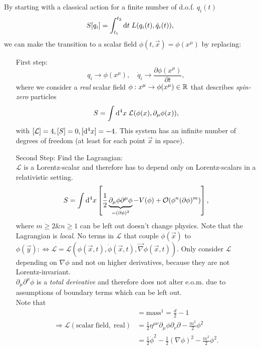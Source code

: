 By starting with a classical action for a finite number of d.o.f. $q_i(t)$ 
\begin{equation}
	S[q_i] = \int_{t_1}^{t_2} \mathrm{d} t \; L(q_i(t),\dot{q}_i(t)),
\end{equation}
we can make the transition to a scalar field $\phi(t,\vec{x})=\phi(x^{\mu})$ by replacing:
\begin{enumerate}
	\item[First step:] 
	\begin{equation}
		q_i \rightarrow \phi(x^{\mu}),\quad \dot{q}_i \rightarrow \frac{\partial \phi(x^{\mu})}{\partial t},
	\end{equation}
	where we consider a \emph{real} scalar field $\phi:x^{\mu} \rightarrow \phi(x^{\mu}) \in \mathbb{R}$ that describes \emph{spin-zero} particles 
	\begin{equation}
		S = \int \mathrm{d}^4 x \; \mathcal{L}(\phi(x),\partial_{\mu} \phi(x)),
	\end{equation}
	with $[\mathcal{L}]=4,[S]=0, [\mathrm{d}^4 x]=-4$. This system has an infinite number of degrees of freedom (at least for each point $\vec{x}$ in space).
	\item[Second Step:] Find the Lagrangian:\\
	$\mathcal{L}$ is a Lorentz-scalar and therefore has to depend only on Lorentz-scalars in a relativistic setting.
	\begin{equation}
		S = \int \mathrm{d}^4 x \left[\frac{1}{2} \underbrace{\partial_{\mu}\phi \partial^{\mu} \phi}_{=(\partial \phi)^2} -V(\phi) + \mathcal{O}(\phi^n (\partial \phi)^m)\right],
	\end{equation}
	where $m\geq2 \& n\geq1$ can be left out doesn't change physics.
	Note that the Lagrangian is \emph{local}. No terms in $\mathcal{L}$ that couple $\phi(\vec{x})$ to $\phi(\vec{y}): \Leftrightarrow \mathcal{L}=\mathcal{L}\left(\phi(\vec{x},t),\dot{\phi}(\vec{x},t), \vec{\nabla} \phi(\vec{x},t)\right)$. Only consider $\mathcal{L}$ depending on $\nabla\phi$ and not on higher derivatives, because they are not Lorentz-invariant.\\
	$\partial_{\mu}\partial^{\mu}\phi$ is a \emph{total derivative} and therefore does not alter e.o.m. due to assumptions of boundary terms which can be left out.\\
	Note that
	\begin{align}
		[\phi] &= \mathrm{mass}^1 = \frac{d}{2} -1 \\
		 \Rightarrow \mathcal{L} (\mathrm{scalar \; field, \; real}) &= \frac{1}{2} \eta^{\mu \nu} \partial_{\mu} \phi \partial_{\nu} \partial - \frac{m^2}{2} \phi^2 \nonumber \\
		 &= \frac{1}{2} \dot{\phi}^2 - \frac{1}{2} (\nabla \phi)^2 - \frac{m^2}{2} \phi^2.
	\end{align}
\end{enumerate}
